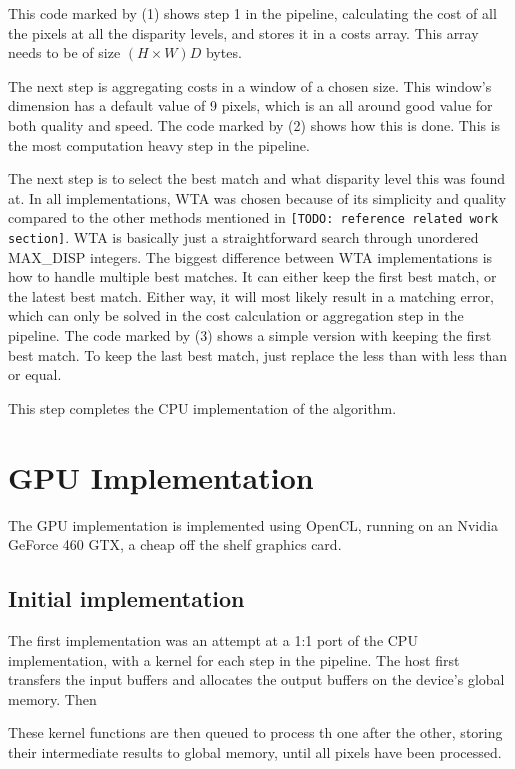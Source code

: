 This code marked by (1) shows step 1 in the pipeline, calculating the
cost of all the pixels at all the disparity levels, and stores it in a
costs array. This array needs to be of size \begin{math} (H \times
  W)D \end{math} bytes.

The next step is aggregating costs in a window of a chosen size. This
window's dimension has a default value of 9 pixels, which is an all
around good value for both quality and speed. The code marked by (2)
shows how this is done. This is the most computation heavy step in the
pipeline.

The next step is to select the best match and what disparity level
this was found at. In all implementations, WTA was chosen because of
its simplicity and quality compared to the other methods mentioned in
\texttt{[TODO: reference related work section]}. WTA is basically just
a straightforward search through unordered MAX\_DISP integers. The
biggest difference between WTA implementations is how to handle
multiple best matches. It can either keep the first best match, or the
latest best match. Either way, it will most likely result in a
matching error, which can only be solved in the cost calculation or
aggregation step in the pipeline. The code marked by (3) shows a
simple version with keeping the first best match. To keep the last
best match, just replace the less than with less than or equal.

This step completes the CPU implementation of the algorithm.


\section{GPU Implementation}

The GPU implementation is implemented using OpenCL, running on an
Nvidia GeForce 460 GTX, a cheap off the shelf graphics card.

\subsection{Initial implementation}

The first implementation was an attempt at a 1:1 port of the CPU
implementation, with a kernel for each step in the pipeline. The host
first transfers the input buffers and allocates the output buffers on
the device's global memory. Then

These
kernel functions are then queued to process th one after the other, storing their
intermediate results to global memory, until all pixels have been
processed.

